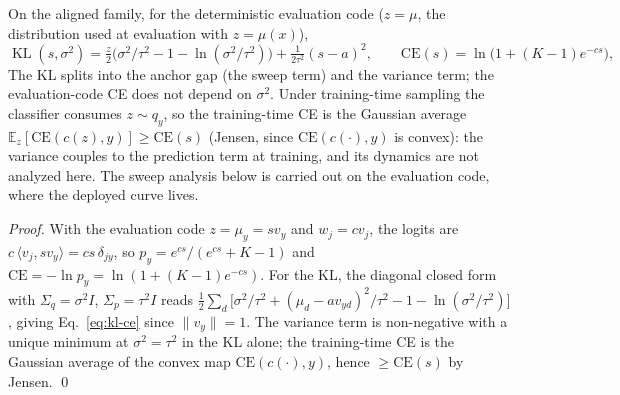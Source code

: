 \begin{lemma}\label{lem:lagrangian}
On the aligned family, for the deterministic evaluation code ($z = \mu$, the
distribution used at evaluation with $z = \mu(x)$),
\begin{equation}
\operatorname{KL}(s, \sigma^2)
= \tfrac{z}{2}\big(\sigma^2/\tau^2 - 1 - \ln(\sigma^2/\tau^2)\big)
+ \tfrac{1}{2\tau^2}(s-a)^2,
\qquad
\mathrm{CE}(s) = \ln\!\big(1 + (K-1)e^{-cs}\big),
\label{eq:kl-ce}
\end{equation}
The KL splits into the anchor gap (the sweep term) and the variance term; the
evaluation-code CE does not depend on $\sigma^2$. Under training-time sampling the
classifier consumes $z \sim q_y$, so the training-time CE is the Gaussian average
$\mathbb{E}_z[\mathrm{CE}(c(z), y)] \ge \mathrm{CE}(s)$ (Jensen, since
$\mathrm{CE}(c(\cdot), y)$ is convex): the variance couples to the prediction term at
training, and its dynamics are not analyzed here. The sweep analysis below is carried
out on the evaluation code, where the deployed curve lives.
\end{lemma}

\begin{proof}
With the evaluation code $z = \mu_y = s v_y$ and $w_j = c v_j$, the logits are
$c\,\langle v_j, s v_y\rangle = cs\,\delta_{jy}$, so $p_y = e^{cs}/(e^{cs} + K - 1)$
and $\mathrm{CE} = -\ln p_y = \ln(1 + (K-1)e^{-cs})$.
For the KL, the diagonal closed form with $\Sigma_q = \sigma^2 I$,
$\Sigma_p = \tau^2 I$ reads
$\tfrac{1}{2}\sum_d\big[\sigma^2/\tau^2 + (\mu_d - a v_{yd})^2/\tau^2 - 1
- \ln(\sigma^2/\tau^2)\big]$, giving
Eq.~\eqref{eq:kl-ce} since $\|v_y\| = 1$. The variance term is non-negative with a
unique minimum at $\sigma^2 = \tau^2$ in the KL alone; the training-time CE is the
Gaussian average of the convex map $\mathrm{CE}(c(\cdot), y)$, hence $\ge \mathrm{CE}(s)$
by Jensen. \hfill\qed
\end{proof}

